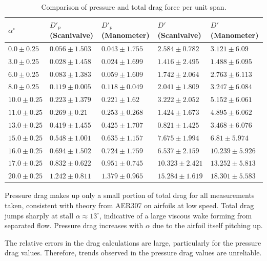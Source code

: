 \documentclass[runningheads]{llncs}
\begin{document}
\begin{table}[h]
\centering
\begin{tabular}{p{3cm}p{3cm}p{3cm}p{3cm}p{3cm}}
\toprule
$\alpha^\circ$ & $D'_p$ (Scanivalve) & $D'_p$ (Manometer) & $D'$ (Scanivalve) & $D'$ (Manometer) \\
\midrule
 $0.0\pm0.25$ &     $0.056\pm1.503$ &    $0.043\pm1.755$ &   $2.584\pm0.782$ &   $3.121\pm6.09$ \\
 $3.0\pm0.25$ &     $0.028\pm1.458$ &    $0.024\pm1.699$ &   $1.416\pm2.495$ &  $1.488\pm6.095$ \\
 $6.0\pm0.25$ &     $0.083\pm1.383$ &    $0.059\pm1.609$ &   $1.742\pm2.064$ &  $2.763\pm6.113$ \\
 $8.0\pm0.25$ &     $0.119\pm0.005$ &    $0.118\pm0.049$ &   $2.041\pm1.809$ &  $3.247\pm6.084$ \\
$10.0\pm0.25$ &     $0.223\pm1.379$ &     $0.221\pm1.62$ &   $3.222\pm2.052$ &  $5.152\pm6.061$ \\
$11.0\pm0.25$ &      $0.269\pm0.21$ &    $0.253\pm0.268$ &   $1.424\pm1.673$ &  $4.895\pm6.062$ \\
$13.0\pm0.25$ &     $0.419\pm1.455$ &    $0.425\pm1.707$ &   $0.821\pm1.425$ &  $3.468\pm6.076$ \\
$15.0\pm0.25$ &     $0.548\pm1.001$ &    $0.635\pm1.157$ &   $7.675\pm1.994$ &   $6.81\pm5.974$ \\
$16.0\pm0.25$ &     $0.694\pm1.502$ &    $0.724\pm1.759$ &   $6.537\pm2.159$ & $10.239\pm5.926$ \\
$17.0\pm0.25$ &     $0.832\pm0.622$ &    $0.951\pm0.745$ &  $10.323\pm2.421$ & $13.252\pm5.813$ \\
$20.0\pm0.25$ &     $1.242\pm0.811$ &    $1.379\pm0.965$ &  $15.284\pm1.619$ & $18.301\pm5.583$ \\
\bottomrule
\end{tabular}
\caption{Comparison of pressure and total drag force per unit span.}
\label{tab:pressure_comparison}
\end{table}

\noindent
Pressure drag makes up only a small portion of total drag for all measurements taken, consistent with theory from AER307 on airfoils at low speed. Total drag jumps sharply at stall $\alpha \approx 13^\circ$, indicative of a large viscous wake forming from separated flow. Pressure drag increases with $\alpha$ due to the airfoil itself pitching up. \newline

\noindent
The relative errors in the drag calculations are large, particularly for the pressure drag values. Therefore, trends observed in the pressure drag values are unreliable.
\end{document}
